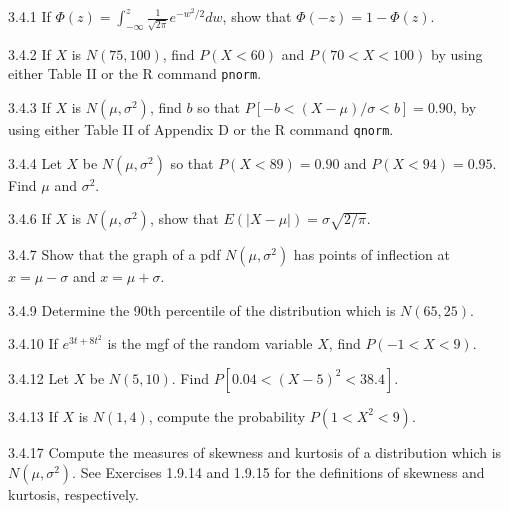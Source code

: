 \begin{exercise}{3.4.1}
If $\Phi(z) = \int_{-\infty}^z \frac{1}{\sqrt{2\pi}}e^{-w^2/2}dw$, show that $\Phi(-z) = 1 - \Phi(z)$.
\end{exercise}

\begin{exercise}{3.4.2}
If $X$ is $N(75, 100)$, find $P(X < 60)$ and $P(70 < X < 100)$ by using either Table II or the R command \texttt{pnorm}.
\end{exercise}

\begin{exercise}{3.4.3}
If $X$ is $N(\mu, \sigma^2)$, find $b$ so that $P[-b < (X-\mu)/\sigma < b] = 0.90$, by using either Table II of Appendix D or the R command \texttt{qnorm}.
\end{exercise}

\begin{exercise}{3.4.4}
Let $X$ be $N(\mu, \sigma^2)$ so that $P(X < 89) = 0.90$ and $P(X < 94) = 0.95$. Find $\mu$ and $\sigma^2$.
\end{exercise}

\begin{exercise}{3.4.6}
If $X$ is $N(\mu, \sigma^2)$, show that $E(|X-\mu|) = \sigma\sqrt{2/\pi}$.
\end{exercise}

\begin{exercise}{3.4.7}
Show that the graph of a pdf $N(\mu, \sigma^2)$ has points of inflection at $x = \mu - \sigma$ and $x = \mu + \sigma$.
\end{exercise}

\begin{exercise}{3.4.9}
Determine the 90th percentile of the distribution which is $N(65, 25)$.
\end{exercise}

\begin{exercise}{3.4.10}
If $e^{3t+8t^2}$ is the mgf of the random variable $X$, find $P(-1 < X < 9)$.
\end{exercise}

\begin{exercise}{3.4.12}
Let $X$ be $N(5, 10)$. Find $P[0.04 < (X-5)^2 < 38.4]$.
\end{exercise}

\begin{exercise}{3.4.13}
If $X$ is $N(1, 4)$, compute the probability $P(1 < X^2 < 9)$.
\end{exercise}

\begin{exercise}{3.4.17}
Compute the measures of skewness and kurtosis of a distribution which is $N(\mu, \sigma^2)$. See Exercises 1.9.14 and 1.9.15 for the definitions of skewness and kurtosis, respectively.
\end{exercise}

